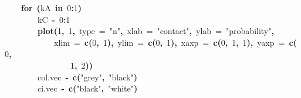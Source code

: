 \documentclass{article}
\makeatletter
\newcommand{\hlnumber}[1]{\textcolor[rgb]{0,0,0}{#1}}%
\newcommand{\hlfunctioncall}[1]{\textcolor[rgb]{.5,0,.33}{\textbf{#1}}}%
\newcommand{\hlstring}[1]{\textcolor[rgb]{.6,.6,1}{#1}}%
\newcommand{\hlkeyword}[1]{\textbf{#1}}%
\newcommand{\hlargument}[1]{\textcolor[rgb]{.69,.25,.02}{#1}}%
\newcommand{\hlassignement}[1]{\textbf{#1}}%
\newcommand{\hlsymbol}[1]{#1}%
\newcommand{\hlstd}[1]{\textcolor[rgb]{0,0,0}{#1}}%
\newenvironment{kframe}{%
 \def\FrameCommand##1{\hskip\@totalleftmargin \hskip-\fboxsep
 \colorbox{shadecolor}{##1}\hskip-\fboxsep
     \hskip-\linewidth \hskip-\@totalleftmargin \hskip\columnwidth}%
 \MakeFramed {\advance\hsize-\width
   \@totalleftmargin\z@ \linewidth\hsize
   \@setminipage}}%
 {\par\unskip\endMakeFramed}
\newenvironment{knitrout}{}{} %
\makeatother
\begin{document}
\begin{knitrout}
{\begin{kframe}
\begin{flushleft}
\hlstd{}{\ }{\ }{\ }{\ }\hlkeyword{for}{\ }\hlkeyword{(}\hlsymbol{kA}{\ }\hlkeyword{in}{\ }\hlnumber{0}\hlkeyword{:}\hlnumber{1}\hlkeyword{)}{\ }\hlkeyword{\usebox{\hlnormalsizeboxopenbrace}}\hspace*{\fill}\\
\hlstd{}{\ }{\ }{\ }{\ }{\ }{\ }{\ }{\ }\hlsymbol{kC}{\ }\hlassignement{\usebox{\hlnormalsizeboxlessthan}-}{\ }\hlnumber{0}\hlkeyword{:}\hlnumber{1}\hspace*{\fill}\\
\hlstd{}{\ }{\ }{\ }{\ }{\ }{\ }{\ }{\ }\hlfunctioncall{plot}\hlkeyword{(}\hlnumber{1}\hlkeyword{,}{\ }\hlnumber{1}\hlkeyword{,}{\ }\hlargument{type}{\ }\hlargument{=}{\ }\hlstring{"n"}\hlkeyword{,}{\ }\hlargument{xlab}{\ }\hlargument{=}{\ }\hlstring{"contact"}\hlkeyword{,}{\ }\hlargument{ylab}{\ }\hlargument{=}{\ }\hlstring{"probability"}\hlkeyword{,}\hspace*{\fill}\\
\hlstd{}{\ }{\ }{\ }{\ }{\ }{\ }{\ }{\ }{\ }{\ }{\ }{\ }\hlargument{xlim}{\ }\hlargument{=}{\ }\hlfunctioncall{c}\hlkeyword{(}\hlnumber{0}\hlkeyword{,}{\ }\hlnumber{1}\hlkeyword{)}\hlkeyword{,}{\ }\hlargument{ylim}{\ }\hlargument{=}{\ }\hlfunctioncall{c}\hlkeyword{(}\hlnumber{0}\hlkeyword{,}{\ }\hlnumber{1}\hlkeyword{)}\hlkeyword{,}{\ }\hlargument{xaxp}{\ }\hlargument{=}{\ }\hlfunctioncall{c}\hlkeyword{(}\hlnumber{0}\hlkeyword{,}{\ }\hlnumber{1}\hlkeyword{,}{\ }\hlnumber{1}\hlkeyword{)}\hlkeyword{,}{\ }\hlargument{yaxp}{\ }\hlargument{=}{\ }\hlfunctioncall{c}\hlkeyword{(}\hlnumber{0}\hlkeyword{,}\hspace*{\fill}\\
\hlstd{}{\ }{\ }{\ }{\ }{\ }{\ }{\ }{\ }{\ }{\ }{\ }{\ }{\ }{\ }{\ }{\ }\hlnumber{1}\hlkeyword{,}{\ }\hlnumber{2}\hlkeyword{)}\hlkeyword{)}\hspace*{\fill}\\
\hlstd{}{\ }{\ }{\ }{\ }{\ }{\ }{\ }{\ }\hlsymbol{col.vec}{\ }\hlassignement{\usebox{\hlnormalsizeboxlessthan}-}{\ }\hlfunctioncall{c}\hlkeyword{(}\hlstring{"grey"}\hlkeyword{,}{\ }\hlstring{"black"}\hlkeyword{)}\hspace*{\fill}\\
\hlstd{}{\ }{\ }{\ }{\ }{\ }{\ }{\ }{\ }\hlsymbol{ci.vec}{\ }\hlassignement{\usebox{\hlnormalsizeboxlessthan}-}{\ }\hlfunctioncall{c}\hlkeyword{(}\hlstring{"black"}\hlkeyword{,}{\ }\hlstring{"white"}\hlkeyword{)}\hspace*{\fill}\\
\hlstd{}\hspace*{\fill}\\

\end{flushleft}
\end{kframe}}
\end{knitrout}
\end{document}
